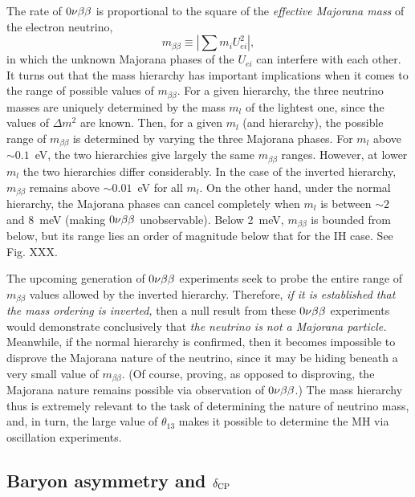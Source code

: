 \documentclass[../thesis.tex]{subfiles}
\begin{document}
The rate of $0\nu\beta\beta$ is proportional to the square of the \emph{effective Majorana mass} of the electron neutrino,
\begin{equation*}
  m_{\beta\beta} \equiv \left| \sum m_i U^2_{ei} \right|,
\end{equation*}
in which the unknown Majorana phases of the $U_{ei}$ can interfere with each other. It turns out that the mass hierarchy has important implications when it comes to the range of possible values of $m_{\beta\beta}$. For a given hierarchy, the three neutrino masses are uniquely determined by the mass $m_l$ of the lightest one, since the values of $\Delta m^2$ are known. Then, for a given $m_l$ (and hierarchy), the possible range of $m_{\beta\beta}$ is determined by varying the three Majorana phases. For $m_l$ above $\sim0.1$~eV, the two hierarchies give largely the same $m_{\beta\beta}$ ranges. However, at lower $m_l$ the two hierarchies differ considerably. In the case of the inverted hierarchy, $m_{\beta\beta}$ remains above $\sim0.01$~eV for all $m_l$. On the other hand, under the normal hierarchy, the Majorana phases can cancel completely when $m_l$ is between $\sim2$ and 8~meV (making $0\nu\beta\beta$ unobservable). Below 2~meV, $m_{\beta\beta}$ is bounded from below, but its range lies an order of magnitude below that for the IH case. See Fig. XXX.

The upcoming generation of $0\nu\beta\beta$ experiments seek to probe the entire range of $m_{\beta\beta}$ values allowed by the inverted hierarchy. Therefore, \emph{if it is established that the mass ordering is inverted,} then a null result from these $0\nu\beta\beta$ experiments would demonstrate conclusively that \emph{the neutrino is not a Majorana particle.} Meanwhile, if the normal hierarchy is confirmed, then it becomes impossible to disprove the Majorana nature of the neutrino, since it may be hiding beneath a very small value of $m_{\beta\beta}$. (Of course, proving, as opposed to disproving, the Majorana nature remains possible via observation of $0\nu\beta\beta$.) The mass hierarchy thus is extremely relevant to the task of determining the nature of neutrino mass, and, in turn, the large value of $\theta_{13}$ makes it possible to determine the MH via oscillation experiments.

\subsection{Baryon asymmetry and $\delta_\text{CP}$}
\label{sec:baryonAsym}
\end{document}
